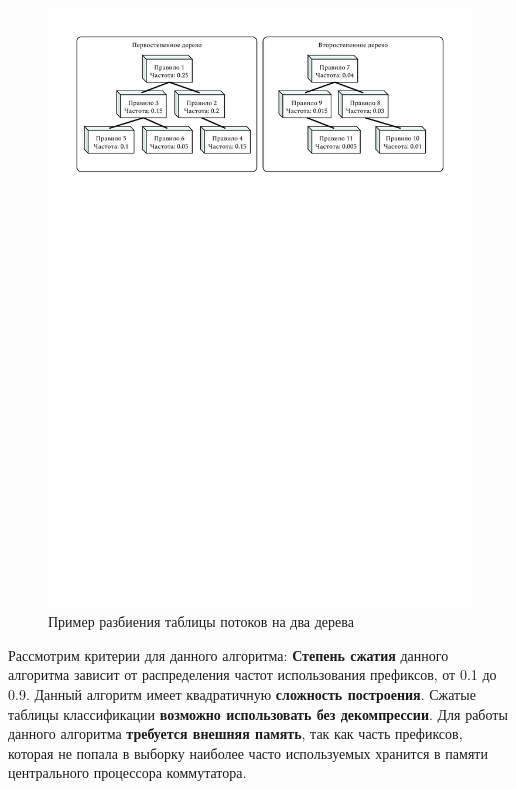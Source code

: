 \documentclass[oneside,final,12pt]{extarticle}
\begin{document}
            \begin{figure}[h]
                \centering
                \includegraphics[trim=0 1200 0 0,clip,width=\textwidth]{optimal.pdf}
                \caption{Пример разбиения таблицы потоков на два дерева}
                \label{img:optimal}
            \end{figure}
            
            Рассмотрим критерии для данного алгоритма: \textbf{Степень сжатия} данного алгоритма зависит от распределения частот использования префиксов, от 0.1 до 0.9.
            Данный алгоритм имеет квадратичную \textbf{сложность построения}. Сжатые таблицы классификации \textbf{возможно использовать без декомпрессии}.
            Для работы данного алгоритма \textbf{требуется внешняя память}, так как часть префиксов, которая не попала в выборку наиболее часто используемых хранится в
            памяти центрального процессора коммутатора.
\end{document}
